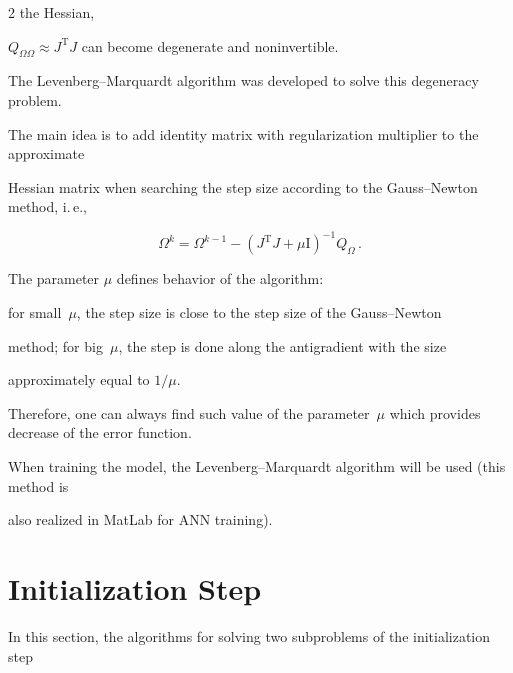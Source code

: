 \begin{multicols}{2}
the Hessian,

 $Q_{\Omega \Omega} \approx { J}^{\mathrm{T}} { J}$ can become degenerate and noninvertible.

 {

 

 }

 

The Levenberg--Marquardt algorithm \cite{LM} was developed to solve this degeneracy problem. 

The main idea is to add identity matrix with regularization multiplier to the approximate 

Hessian matrix when searching the step size according to the Gauss--Newton method, i.\,e.,

{



}

\begin{equation}

  \label{lm}

  \Omega^k = \Omega^{k-1} - \left( { J}^{\mathrm{T}} { J} + \mu \mathrm{I} \right)^{-1} Q_\Omega\,.

\end{equation}

The parameter $\mu$ defines behavior of the algorithm:

for small~$\mu$, the step size is close to the step size of the Gauss--Newton 

method; for big~$\mu$, the step is done along the antigradient with the size 

approximately equal to ${1}/{\mu}$.

Therefore, one can always find such value of the parameter~$\mu$ which provides decrease of the error function. 

When training the model, the Levenberg--Marquardt algorithm will be used (this method is 

also realized in MatLab for ANN training).



\section{Initialization Step}

\label{stage1}



\noindent

In this section, the algorithms for solving two subproblems of the initialization step


\end{multicols}
